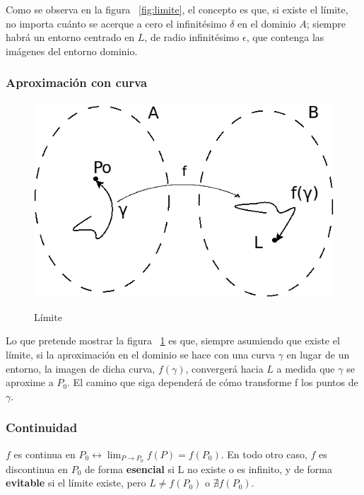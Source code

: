 \documentclass{article}
\begin{document}
Como se observa en la figura ~\ref{fig:limite}, el concepto es que, si existe el límite, no importa cuánto se acerque a cero el infinitésimo $\delta$ en el dominio $A$; siempre habrá un entorno centrado en $L$, de radio infinitésimo $\epsilon$, que contenga las imágenes del entorno dominio.

\subsubsection{Aproximación con curva}

\begin{figure}[t]
\caption{Límite}
\includegraphics[scale=0.75]{img/teo_fig003_limite_curva.png} 
\centering
\label{fig:limite_curva}
\end{figure}

Lo que pretende mostrar la figura ~\ref{fig:limite_curva} es que, siempre asumiendo que existe el límite, si la aproximación en el dominio se hace con una curva $\gamma$ en lugar de un entorno, la imagen de dicha curva, $f(\gamma)$, convergerá hacia $L$ a medida que $\gamma$ se aproxime a $P_0$. El camino que siga dependerá de cómo transforme f los puntos de $\gamma$.

\subsubsection{Continuidad}

$f$ es continua en $P_0 \longleftrightarrow \displaystyle{\lim_{P \rightarrow P_0}} f(P) = f(P_0)$. En todo otro caso, $f$ es discontinua en $P_0$ de forma \textbf{esencial} si L no existe o es infinito, y de forma \textbf{evitable} si el límite existe, pero $L \neq f(P_0)$ o $\nexists f(P_0)$.
\end{document}
